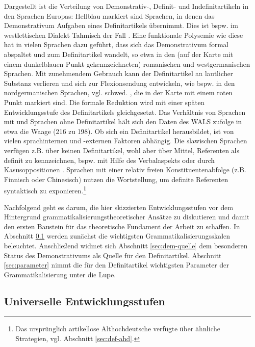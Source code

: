 Dargestellt ist die Verteilung von Demonstrativ-, Definit- und Indefinitartikeln in den Sprachen Europas: Hellblau markiert sind Sprachen, in denen das Demonstrativum Aufgaben eines Definitartikels übernimmt. Dies ist bspw. im westlettischen Dialekt Tahmisch der Fall \parencite[573-574]{Schroeder2006}.
Eine funktionale Polysemie wie diese hat in vielen Sprachen dazu geführt, dass sich das Demonstrativum formal abspaltet und zum  Definitartikel wandelt, so etwa in den (auf der Karte mit einem dunkelblauen Punkt gekennzeichneten) romanischen und westgermanischen Sprachen. Mit zunehmendem Gebrauch kann der Definitartikel an lautlicher Substanz 
verlieren und sich zur Flexionsendung entwickeln, wie bspw. in den  nordgermanischen Sprachen, vgl. schwed.  , die in der Karte mit einem roten Punkt markiert sind.  Die formale Reduktion wird mit einer späten Entwicklungsstufe des Definitartikels gleichgesetzt. Das Verhältnis von Sprachen mit und Sprachen ohne Definitartikel hält sich den Daten des WALS zufolge \parencite[Kapitel 37]{Dryer2013} in etwa die Waage (216 zu 198). Ob sich ein Definitartikel herausbildet, ist von vielen sprachinternen und -externen Faktoren abhängig. Die slawischen Sprachen verfügen z.B. über keinen Definitartikel, wohl aber über Mittel, Referenten als definit zu kennzeichnen, bspw. mit Hilfe des Verbalaspekts oder durch Kasusoppositionen \parencite{Hauenschild1993,Leiss2000}. Sprachen mit einer relativ freien Konstituentenabfolge (z.B. Finnisch oder Chinesisch) nutzen die Wortstellung, um definite Referenten syntaktisch zu exponieren.\footnote{
Das ursprünglich artikellose Althochdeutsche verfügte über ähnliche Strategien, vgl. Abschnitt \ref{sec:def-ahd}.}

Nachfolgend geht es darum, die hier skizzierten Entwicklungsstufen vor dem Hintergrund grammatikalisierungstheoretischer Ansätze zu diskutieren und damit den ersten Baustein für das theoretische Fundament der Arbeit zu schaffen. 
In Abschnitt \ref{sec:stufen} werden zunächst die wichtigsten Grammatikalisierungsskalen beleuchtet.  
Anschließend widmet sich Abschnitt \ref{sec:dem-quelle} dem besonderen Status des Demonstrativums als Quelle für den Definitartikel. Abschnitt \ref{sec:parameter} nimmt die für den Definitartikel wichtigsten Parameter der Grammatikalisierung unter die Lupe. 


\subsection{Universelle Entwicklungsstufen}\label{sec:stufen}


